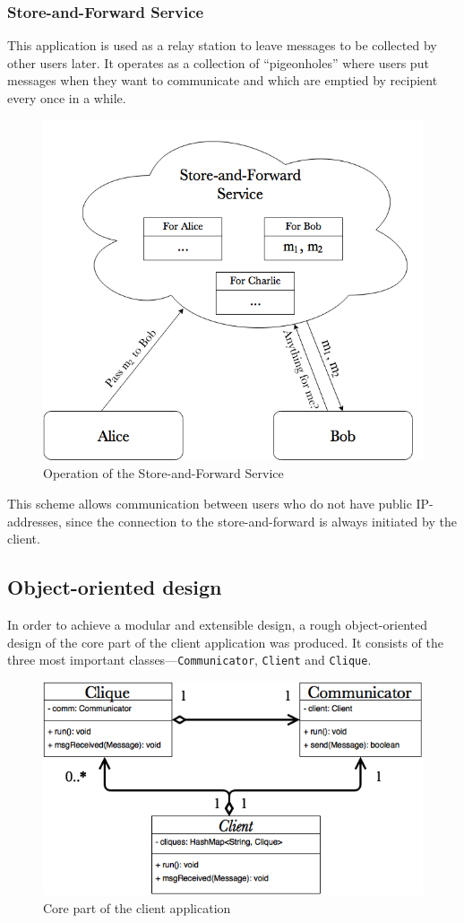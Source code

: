 \documentclass[a4paper, twoside, 12pt]{report}
\begin{document}
\subsubsection{Store-and-Forward Service}
        This application is used as a relay station to leave messages to be collected by other users later. It operates as a collection of ``pigeonholes'' where users put messages when they want to communicate and which are emptied by recipient every once in a while. 
        \begin{figure}[H]
            \centering
            \includegraphics[width = 0.50 \linewidth]{pics/saf.png}
            \caption{\label{fig:addressBook}Operation of the Store-and-Forward Service}
        \end{figure}
This scheme allows communication between users who do not have public IP-addresses, since the connection to the store-and-forward is always initiated by the client.
\restoregeometry
        

\subsection{Object-oriented design}
In order to achieve a modular and extensible design, a rough object-oriented design of the core part of the client application was produced. It consists of the three most important classes---\texttt{Communicator}, \texttt{Client} and \texttt{Clique}.

\begin{figure}[H]
    \centering
    \includegraphics[width = 0.7 \linewidth]{pics/core_uml.png}
    \caption{\label{fig:core_uml} Core part of the client application}
\end{figure}
\end{document}
